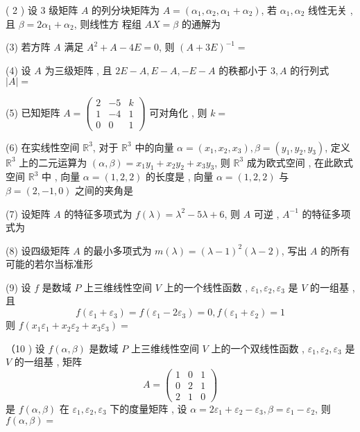 \documentclass[10pt]{article}
\begin{document}
{( 2 )  设  3  级矩阵  $A$  的列分块矩阵为  $A=\left(\alpha_{1}, \alpha_{2}, \alpha_{1}+\alpha_{2}\right)$,  若  $\alpha_{1}, \alpha_{2}$  线性无关 ,  且  $\beta=2 \alpha_{1}+\alpha_{2}$,  则线性方   程组  $A X=\beta$  的通解为 

(3)  若方阵  $A$  满足  $A^{2}+A-4 E=0$,  则  $(A+3 E)^{-1}=$

(4)  设  $A$  为三级矩阵 ,  且  $2 E-A, E-A,-E-A$  的秩都小于  $3, A$  的行列式  $|A|=$

(5)  已知矩阵  $A=\left(\begin{array}{ccc}2 & -5 & k \\ 1 & -4 & 1 \\ 0 & 0 & 1\end{array}\right)$  可对角化 ,  则  $k=$

(6)  在实线性空间  $\mathbb{R}^{3}$,  对于  $\mathbb{R}^{3}$  中的向量  $\alpha=\left(x_{1}, x_{2}, x_{3}\right), \beta=\left(y_{1}, y_{2}, y_{3}\right)$,  定义  $\mathbb{R}^{3}$  上的二元运算为  $(\alpha, \beta)=x_{1} y_{1}+x_{2} y_{2}+x_{3} y_{3}$,  则  $\mathbb{R}^{3}$  成为欧式空间 ,  在此欧式空间  $\mathbb{R}^{3}$  中 ,  向量  $\alpha=(1,2,2)$  的长度是  ,  向量  $\alpha=(1,2,2)$  与  $\beta=(2,-1,0)$  之间的夹角是 

(7)  设矩阵  $A$  的特征多项式为  $f(\lambda)=\lambda^{2}-5 \lambda+6$,  则  $A$  可逆 , $A^{-1}$  的特征多项式为 

(8)  设四级矩阵  $A$  的最小多项式为  $m(\lambda)=(\lambda-1)^{2}(\lambda-2)$,  写出  $A$  的所有可能的若尔当标准形 

(9)  设  $f$  是数域  $P$  上三维线性空间  $V$  上的一个线性函数 , $\varepsilon_{1}, \varepsilon_{2}, \varepsilon_{3}$  是  $V$  的一组基 ,  且 
$$
f\left(\varepsilon_{1}+\varepsilon_{3}\right)=f\left(\varepsilon_{1}-2 \varepsilon_{3}\right)=0, f\left(\varepsilon_{1}+\varepsilon_{2}\right)=1
$$
 则  $f\left(x_{1} \varepsilon_{1}+x_{2} \varepsilon_{2}+x_{3} \varepsilon_{3}\right)=$

（10 )  设  $f(\alpha, \beta)$  是数域  $P$  上三维线性空间  $V$  上的一个双线性函数 , $\varepsilon_{1}, \varepsilon_{2}, \varepsilon_{3}$  是  $V$  的一组基 ,  矩阵 
$$
A=\left(\begin{array}{lll}
1 & 0 & 1 \\
0 & 2 & 1 \\
2 & 1 & 0
\end{array}\right)
$$
 是  $f(\alpha, \beta)$  在  $\varepsilon_{1}, \varepsilon_{2}, \varepsilon_{3}$  下的度量矩阵 ,  设  $\alpha=2 \varepsilon_{1}+\varepsilon_{2}-\varepsilon_{3}, \beta=\varepsilon_{1}-\varepsilon_{2}$,  则  $f(\alpha, \beta)=$

}
\end{document}
